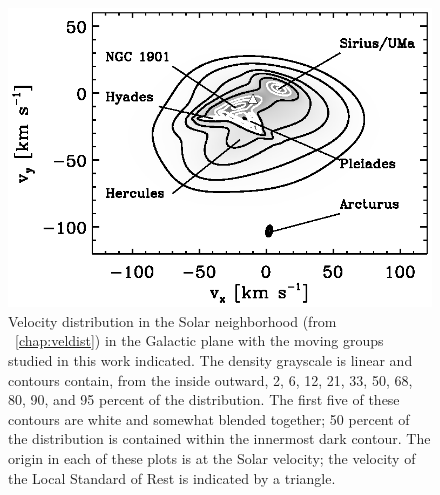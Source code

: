 \clearpage
\begin{figure}
\includegraphics{figs_groups/veldist.eps}
\caption[Velocity distribution in the Solar neighborhood (from \chaptername~\ref{chap:veldist}) in the Galactic plane with the most prominent moving groups
  indicated]{Velocity distribution in the Solar neighborhood
  (from \chaptername~\ref{chap:veldist}) in the Galactic plane with
  the moving groups studied in this work indicated. The density
  grayscale is linear and contours contain, from the inside outward,
  2, 6, 12, 21, 33, 50, 68, 80, 90, and 95 percent of the
  distribution. The first five of these contours are white and
  somewhat blended together; 50 percent of the distribution is
  contained within the innermost dark contour. The origin in each of
  these plots is at the Solar velocity; the velocity of the Local
  Standard of Rest \citep{2005ApJ...629..268H} is indicated by a
  triangle.}\label{fig:veldist}
\end{figure}

